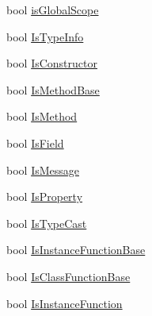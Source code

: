 \begin{DoxyCompactItemize}
bool \hyperlink{classi_c_s___member_info_a094243ef831ec40e9e7b7e89c8209cce}{is\+Global\+Scope}
\item 
bool \hyperlink{classi_c_s___member_info_ab3986c0edebaca789d8c465667543370}{Is\+Type\+Info}
\item 
bool \hyperlink{classi_c_s___member_info_aea0dcf332478f47851ba686c75324859}{Is\+Constructor}
\item 
bool \hyperlink{classi_c_s___member_info_a0467f600bc5ed4a3419f79a85b61e916}{Is\+Method\+Base}
\item 
bool \hyperlink{classi_c_s___member_info_aaafbd5bdf3f33dd2f6532338a8c22dd4}{Is\+Method}
\item 
bool \hyperlink{classi_c_s___member_info_ad4c448f2fa0380976235299cb14354ff}{Is\+Field}
\item 
bool \hyperlink{classi_c_s___member_info_acaa4b0857e422a2bbfcb473749255948}{Is\+Message}
\item 
bool \hyperlink{classi_c_s___member_info_a623f46c6c76b180ec722240c67bc156f}{Is\+Property}
\item 
bool \hyperlink{classi_c_s___member_info_a6b993a93e6b1984df1fffd84efa425e9}{Is\+Type\+Cast}
\item 
bool \hyperlink{classi_c_s___member_info_af466ca174d8c124bd8773e366438dfcd}{Is\+Instance\+Function\+Base}
\item 
bool \hyperlink{classi_c_s___member_info_af559152dcda6cb84e8f25d437a12a0d5}{Is\+Class\+Function\+Base}
\item 
bool \hyperlink{classi_c_s___member_info_afdae96603c50ca95b1841dede73883f7}{Is\+Instance\+Function}

\end{DoxyCompactItemize}
